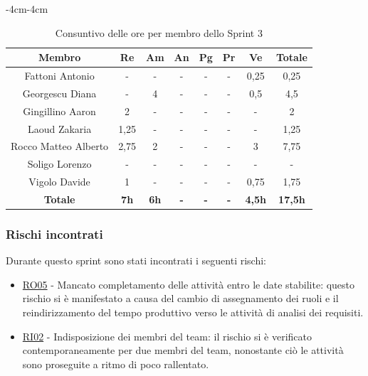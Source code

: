 \documentclass[a4paper,12pt]{article}
\begin{document}
\begin{table}[H]
    \begin{adjustwidth}{-4cm}{-4cm}
    \centering
    \begin{tabular}{|c|c|c|c|c|c|c|c|}
        \hline
        \textbf{Membro}         & \textbf{Re}   & \textbf{Am}   & \textbf{An}   & \textbf{Pg}   & \textbf{Pr}   & \textbf{Ve}   & \textbf{Totale} \\
        \hline
        Fattoni Antonio         & -             & -             & -             & -             & -             & 0,25          & 0,25 \\
        \hline
        Georgescu Diana         & -             & 4             & -             & -             & -             & 0,5           & 4,5 \\
        \hline
        Gingillino Aaron        & 2             & -             & -             & -             & -             & -             & 2 \\
        \hline
        Laoud Zakaria           & 1,25          & -             & -             & -             & -             & -             & 1,25 \\
        \hline
        Rocco Matteo Alberto    & 2,75          & 2             & -             & -             & -             & 3             & 7,75 \\
        \hline
        Soligo Lorenzo          & -             & -             & -             & -             & -             & -             & - \\
        \hline
        Vigolo Davide           & 1             & -             & -             & -             & -             & 0,75          & 1,75\\
        \hline
        \textbf{Totale}         &\textbf{7h}    &\textbf{6h}    &\textbf{-}     &\textbf{-}     &\textbf{-}     &\textbf{4,5h}  &\textbf{17,5h}\\
        \hline
    \end{tabular}
    \caption{Consuntivo delle ore per membro dello Sprint 3}
    \end{adjustwidth}
\end{table}



\subsubsection{Rischi incontrati}
Durante questo sprint sono stati incontrati i seguenti rischi:
\begin{itemize}
    \item \hyperref[RO05]{RO05} - Mancato completamento delle attività entro le date stabilite: questo rischio si è manifestato a causa del cambio di assegnamento dei ruoli e il reindirizzamento del tempo produttivo verso le attività di analisi dei requisiti.
    \item \hyperref[RI02]{RI02} - Indisposizione dei membri del team: il rischio si è verificato contemporaneamente per due membri del team, nonostante ciò le attività sono proseguite a ritmo di poco rallentato.
\end{itemize}
\end{document}
